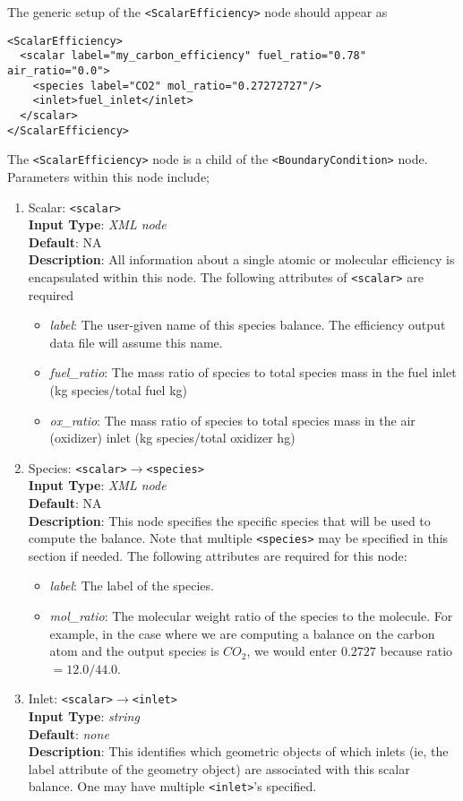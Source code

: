 The generic setup of the \verb=<ScalarEfficiency>= node should appear as
\begin{Verbatim}[fontsize=\footnotesize]
<ScalarEfficiency>
  <scalar label="my_carbon_efficiency" fuel_ratio="0.78" air_ratio="0.0">
    <species label="CO2" mol_ratio="0.27272727"/>
    <inlet>fuel_inlet</inlet>
  </scalar>
</ScalarEfficiency>
\end{Verbatim}

The \verb=<ScalarEfficiency>= node is a child of the \verb=<BoundaryCondition>= node. Parameters within this node include;
%
\begin{enumerate}
\item Scalar: \verb=<scalar>= \\
{\bf Input Type}: {\it XML node} \\
{\bf Default}: NA \\
{\bf Description}: All information about a single atomic or molecular efficiency is encapsulated within this node. The following attributes of \verb=<scalar>= are required
\begin{itemize}
\item {\it label}: The user-given name of this species balance.  The efficiency output data file will assume this name.  
\item {\it fuel\_ratio}: The mass ratio of species to total species mass in the fuel inlet (kg species/total fuel kg)
\item {\it ox\_ratio}: The mass ratio of species to total species mass in the air (oxidizer) inlet (kg species/total oxidizer hg)
\end{itemize}
%
\item Species:  \verb=<scalar>=$\rightarrow$\verb=<species>= \\
{\bf Input Type}: {\it XML node} \\
{\bf Default}: NA \\
{\bf Description}: This node specifies the specific species that will be used to compute the balance.  Note that multiple \verb=<species>= may be specified in this section if needed. The following attributes are required for this node: 
\begin{itemize}
\item {\it label}: The label of the species. 
\item {\it mol\_ratio}: The molecular weight ratio of the species to the molecule.  For example, in the case where we are computing a balance on the carbon atom and the output species is $CO_2$, we would enter $0.2727$ because ratio $= 12.0/44.0$.  
\end{itemize} 
\item Inlet: \verb=<scalar>=$\rightarrow$\verb=<inlet>= \\
{\bf Input Type}: {\it string} \\
{\bf Default}: {\it none} \\
{\bf Description}: This identifies which geometric objects of which inlets (ie, the label attribute of the geometry object) are associated with this scalar balance.  One may have multiple \verb=<inlet>='s specified.  
\end{enumerate}
  

